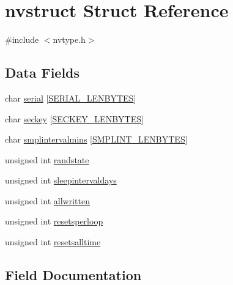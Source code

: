 \hypertarget{structnvstruct}{}\section{nvstruct Struct Reference}
\label{structnvstruct}


{\ttfamily \#include $<$nvtype.\+h$>$}

\subsection*{Data Fields}
\begin{DoxyCompactItemize}
\item 
char \mbox{\hyperlink{structnvstruct_a8c4928cc85c5336514401eb142ea7d50}{serial}} \mbox{[}\mbox{\hyperlink{nvtype_8h_a09589b0f4cf4e32679b6dc064903edef}{S\+E\+R\+I\+A\+L\+\_\+\+L\+E\+N\+B\+Y\+T\+ES}}\mbox{]}
\item 
char \mbox{\hyperlink{structnvstruct_a680c038327bbd20d30beade8d0ef1dd4}{seckey}} \mbox{[}\mbox{\hyperlink{nvtype_8h_ae32c9007f59a1d55426d7fd63e10d589}{S\+E\+C\+K\+E\+Y\+\_\+\+L\+E\+N\+B\+Y\+T\+ES}}\mbox{]}
\item 
char \mbox{\hyperlink{structnvstruct_a34de27bbd20aa5f15e4e4482ce5a0309}{smplintervalmins}} \mbox{[}\mbox{\hyperlink{nvtype_8h_a44d3fb460b6c9383a2b3248544aa13d0}{S\+M\+P\+L\+I\+N\+T\+\_\+\+L\+E\+N\+B\+Y\+T\+ES}}\mbox{]}
\item 
unsigned int \mbox{\hyperlink{structnvstruct_aec7e67f64e6ee88dda940f1b837f9351}{randstate}}
\item 
unsigned int \mbox{\hyperlink{structnvstruct_a7535c524cca52dcf1e60b1e6762fea4c}{sleepintervaldays}}
\item 
unsigned int \mbox{\hyperlink{structnvstruct_a3fee61ddd1d863385c81b1d53599191a}{allwritten}}
\item 
unsigned int \mbox{\hyperlink{structnvstruct_a48f727b15838a972aff7c7d7397ff641}{resetsperloop}}
\item 
unsigned int \mbox{\hyperlink{structnvstruct_a045498ec4eca300d51f030a958ed5ee1}{resetsalltime}}
\end{DoxyCompactItemize}


\subsection{Field Documentation}
\mbox{\label{structnvstruct_a3fee61ddd1d863385c81b1d53599191a}} 
